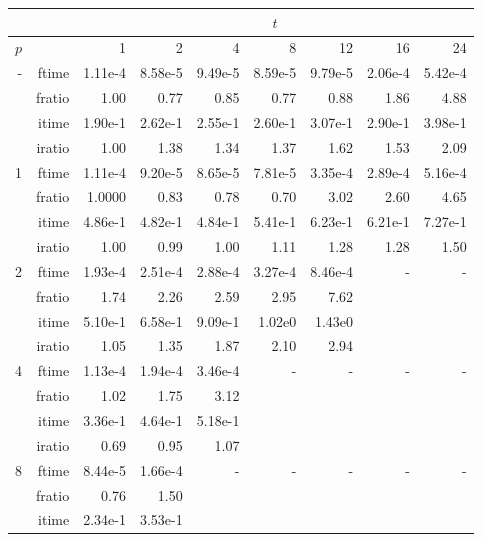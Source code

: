 \documentclass[a4]{article}
\begin{document}
\begin{table}
\begin{center}
\begin{tabular}{|r|r|r|r|r|r|r|r|r|}
\hline 
     &  & \multicolumn{7}{c|}{$t$} \\ \hline
    $p$  &  & 1           & 2    & 4    & 8    & 12   & 16    & 24  \\ \hline\hline
    -  & ftime & 1.11e-4 &   8.58e-5 &   9.49e-5 &   8.59e-5 &   9.79e-5 &   2.06e-4 &   5.42e-4   \\ 
      & fratio & 1.00 &   0.77 &   0.85 &   0.77 &   0.88 &   1.86 &   4.88  \\
     & itime &  1.90e-1 &   2.62e-1 &   2.55e-1 &   2.60e-1 &   3.07e-1 &   2.90e-1 &   3.98e-1   \\ 
     & iratio &  1.00 &   1.38 &   1.34 &   1.37 &   1.62 &   1.53 &   2.09   \\  \hline \hline
    1  & ftime &   1.11e-4 &  9.20e-5 &  8.65e-5 &  7.81e-5 &  3.35e-4&   2.89e-4 &  5.16e-4  \\ 
      & fratio & 1.0000 &   0.83 &   0.78 &   0.70 &   3.02 &   2.60 &   4.65   \\
     & itime & 4.86e-1 &   4.82e-1 &   4.84e-1 &   5.41e-1 &   6.23e-1 &   6.21e-1 &   7.27e-1  \\ 
     & iratio &  1.00 &   0.99 &  1.00 &   1.11 &   1.28 &   1.28 &   1.50  \\  \hline
    2  & ftime & 1.93e-4  & 2.51e-4 &  2.88e-4 &  3.27e-4 &  8.46e-4  & - & - \\ 
      & fratio &   1.74 &   2.26 &   2.59 &   2.95 &   7.62    &  &  \\
      & itime &     5.10e-1 &   6.58e-1 &   9.09e-1 &   1.02e0 &   1.43e0   &  &  \\
      & iratio & 1.05 &   1.35 &   1.87 &   2.10 &   2.94   &  &  \\ \hline
    4  & ftime &  1.13e-4 &  1.94e-4 &  3.46e-4 & - & - & - & - \\ 
      & fratio &   1.02 &   1.75 &   3.12   &  &  &  &  \\ 
      & itime &   3.36e-1 &   4.64e-1 &   5.18e-1  &  & & & \\
      & iratio & 0.69 &   0.95 &   1.07   &  & & &  \\\hline
    8  & ftime & 8.44e-5 &  1.66e-4   & - & - & - & - & - \\ 
      & fratio &  0.76 &   1.50   &  &  &  &  &  \\
      & itime &  2.34e-1 &   3.53e-1   &  & & & & \\

\end{tabular}
\end{center}
\end{table}
\end{document}
